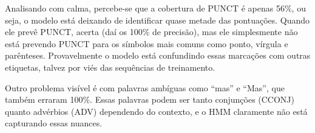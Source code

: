 \documentclass[12pt,a4paper]{article}
\begin{document}
Analisando com calma, percebe-se que a cobertura de PUNCT é apenas 56\%, ou seja, o modelo está deixando de identificar quase metade das pontuações. Quando ele prevê PUNCT, acerta (daí os 100\% de precisão), mas ele simplesmente não está prevendo PUNCT para os símbolos mais comuns como ponto, vírgula e parênteses. Provavelmente o modelo está confundindo essas marcações com outras etiquetas, talvez por viés das sequências de treinamento.

Outro problema visível é com palavras ambíguas como ``mas'' e ``Mas'', que também erraram 100\%. Essas palavras podem ser tanto conjunções (CCONJ) quanto advérbios (ADV) dependendo do contexto, e o HMM claramente não está capturando essas nuances.
\end{document}
